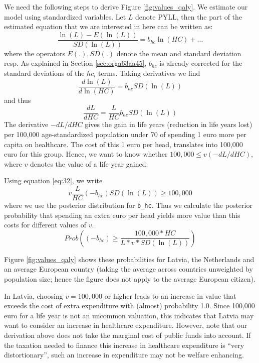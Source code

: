 \documentclass[a4paper,12pt]{article}
\begin{document}
We need the following steps to derive Figure \ref{fig:values_qaly}. We estimate our model using standardized variables. Let \(L\) denote PYLL, then the part of the estimated equation that we are interested in here can be written as:
\begin{equation}
\label{eq:27}
\frac{\ln(L)-E(\ln(L))}{SD(\ln(L))} = b_{hc} \ln(HC) + ...
\end{equation}
where the operators \(E(.),SD(.)\) denote the mean and standard deviation resp. As explained in Section \ref{sec:orga63aa45}, \(b_{hc}\) is already corrected for the standard deviations of the \(hc_i\) terms. Taking derivatives we find
\begin{equation}
\label{eq:31}
\frac{d \ln(L)}{d \ln(HC)} = b_{hc} SD(\ln(L))
\end{equation}
and thus
\begin{equation}
\label{eq:32}
\frac{dL}{dHC} = \frac{L}{HC} b_{hc} SD(\ln(L))
\end{equation}
The derivative \(-dL/dHC\) gives the gain in life years (reduction in life years lost) per 100,000 age-standardized population under 70 of spending 1 euro more per capita on healthcare. The cost of this 1 euro per head, translates into 100,000 euro for this group. Hence, we want to know whether \(100,000 \leq v (-dL/dHC)\), where \(v\) denotes the value of a life year gained. 

Using equation \eqref{eq:32}, we write
\begin{equation}
\label{eq:22}
v \frac{L}{HC} (-b_{hc}) SD(\ln(L)) \geq 100,000
\end{equation}
where we use the posterior distribution for \texttt{b\_hc}. Thus we calculate the posterior probability that spending an extra euro per head yields more value than this costs for different values of \(v\).
\begin{equation}
\label{eq:41}
Prob \left((-b_{hc}) \geq \frac{100,000 * HC}{L* v *SD(\ln(L))}\right)
\end{equation}

Figure \ref{fig:values_qaly} shows these probabilities for Latvia, the Netherlands and an average European country (taking the average across countries unweighted by population size; hence the figure does not apply to the average European citizen).

In Latvia, choosing \(v = 100,000\) or higher leads to an increase in value that exceeds the cost of extra expenditure with (almost) probability 1.0. Since 100,000 euro for a life year is not an uncommon valuation, this indicates that Latvia may want to consider an increase in healthcare expenditure. However, note that our derivation above does not take the marginal cost of public funds into account. If the taxation needed to finance this increase in healthcare expenditure is ``very distortionary'', such an increase in expenditure may not be welfare enhancing.
\end{document}
